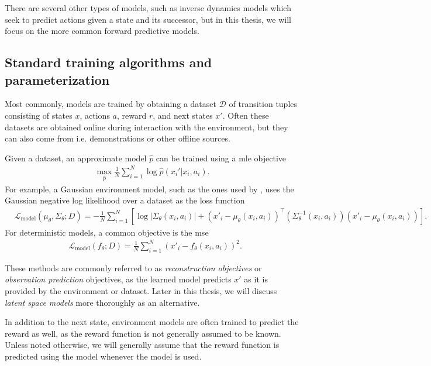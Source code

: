 There are several other types of models, such as inverse dynamics models which seek to predict actions given a state and its successor, but in this thesis, we will focus on the more common forward predictive models.

\subsection{Standard training algorithms and parameterization}

Most commonly, models are trained by obtaining a dataset $\mathcal{D}$ of transition tuples consisting of states $x$, actions $a$, reward $r$, and next states $x'$. 
Often these datasets are obtained online during interaction with the environment, but they can also come from i.e. demonstrations or other offline sources.

Given a dataset, an approximate model $\hat{p}$ can be trained using a \ac{mle} objective 
\begin{align}
\max_{\hat{p}} \frac{1}{N}\sum_{i=1}^N \log \hat{p}(x_i'|x_i,a_i).
\end{align}
For example, a Gaussian environment model, such as the ones used by \textcite{pets,mbpo,voelcker2022value}, uses the Gaussian negative log likelihood over a dataset as the loss function
\begin{align}
    &\mathcal{L}_\mathrm{model}(\mu_\theta, \Sigma_\theta; D) = - \frac{1}{N} \sum_{i=1}^N \left[\log |\Sigma_\theta(x_i, a_i)| + (x'_i - \mu_\theta(x_i, a_i))^\top \left(\Sigma^{-1}_\theta(x_i, a_i) \right) (x'_i - \mu_\theta(x_i, a_i)) \right].
\end{align}
For deterministic models, a common objective is the \ac{mse}
\begin{align}
    &\mathcal{L}_\mathrm{model}(f_\theta; D) = \frac{1}{N} \sum_{i=1}^N (x'_i - f_\theta(x_i, a_i))^2.
\end{align}

These methods are commonly referred to as \emph{reconstruction objectives} or \emph{observation prediction} objectives, as the learned model predicts $x'$ as it is provided by the environment or dataset.
Later in this thesis, we will discuss \emph{latent space models} more thoroughly as an alternative.

In addition to the next state, environment models are often trained to predict the reward as well, as the reward function is not generally assumed to be known.
Unless noted otherwise, we will generally assume that the reward function is predicted using the model whenever the model is used.

